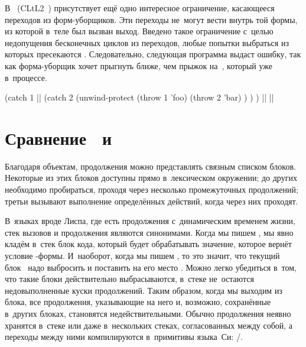 \bigskip

В~{\CommonLisp} (CLtL2~\cite{ste90}) присутствует ещё одно интересное
ограничение, касающееся переходов из форм-уборщиков. Эти переходы не~могут вести
внутрь той формы, из которой в~теле  был вызван выход.
Введено такое ограничение с~целью недопущения бесконечных циклов из переходов,
любые попытки выбраться из которых пресекаются .
 Следовательно, следующая программа выдаст ошибку, так
как форма-уборщик хочет прыгнуть ближе, чем прыжок на~, который уже
в~процессе.

\begin{code:lisp}
(catch 1                  |\dialect{\CommonLisp}|
  (catch 2
    (unwind-protect (throw 1 'foo)
      (throw 2 'bar) ) ) )         |\is| ||
\end{code:lisp}


\section{\texorpdfstring%
{Сравнение \protect{}~и~\protect{}}%
{Сравнение call/cc и catch}}%
\label{escape/sect:comparing}

Благодаря объектам, продолжения можно представлять связным списком блоков.
Некоторые из этих блоков доступны прямо в~лексическом окружении; до других
необходимо пробираться, проходя через несколько промежуточных продолжений;
третьи вызывают выполнение определённых действий, когда через них проходят.

В~языках вроде Лиспа, где есть продолжения с~динамическим временем жизни, стек
вызовов и продолжения являются синонимами. Когда мы пишем , мы явно кладём в~стек блок кода, который будет
обрабатывать значение, которое вернёт условие -формы. И~наоборот, когда
мы пишем , то это значит, что текущий блок~ надо выбросить и
поставить на его место . Можно легко убедиться в~том, что
такие блоки действительно выбрасываются, в~стеке не~остаются недовыполненные
куски продолжений. Таким образом, когда мы выходим из блока, все продолжения,
указывающие на него и, возможно, сохранённые в~других блоках, становятся
недействительными. Обычно продолжения неявно хранятся в~стеке или даже
в~нескольких стеках, согласованных между собой, а переходы между ними
компилируются в~примитивы языка~Си: /.


